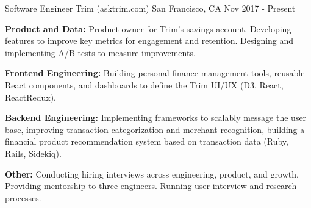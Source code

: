 

\begin{cventries}

  \cventry
    {Software Engineer} %
    {Trim (asktrim.com)} %
    {San Francisco, CA} %
    {Nov 2017 - Present} %
    {
      \begin{cvitems} %
        \item \textbf{Product and Data:} {Product owner for Trim's savings account. Developing features to improve key metrics for engagement and retention. Designing and implementing A/B tests to measure improvements.}
        \item \textbf{Frontend Engineering:} {Building personal finance management tools, reusable React components, and dashboards to define the Trim UI/UX (D3, React, ReactRedux).}
        \item \textbf{Backend Engineering:} {Implementing frameworks to scalably message the user base, improving transaction categorization and merchant recognition, building a financial product recommendation system based on transaction data (Ruby, Rails, Sidekiq).}
        \item \textbf{Other:} {Conducting hiring interviews across engineering, product, and growth. Providing mentorship to three engineers. Running user interview and research processes.}
      \end{cvitems}
    }


\end{cventries}
